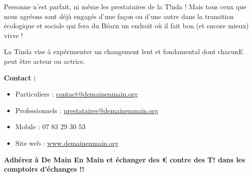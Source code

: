     \vspace{.5cm}

\noindent Personne n’est parfait, ni même les prestataires de la T!nda ! Mais tous ceux que nous agréons sont déjà engagés
d’une façon ou d’une autre dans la transition écologique et sociale qui fera du Béarn un endroit où il fait bon (et
encore mieux) vivre !
    \vspace{.2cm}

\noindent La Tinda vise à expérimenter un changement lent et fondamental dont chacunE peut être acteur ou actrice.

    \vspace{1cm}

      \textbf{Contact :}
    \begin{itemize}
      \item[] Particuliers : \href{mailto:contact@demainenmain.org}{contact@demainenmain.org}
      \item[] Professionnels : \href{mailto:prestataires@demainenmain.org}{prestataires@demainenmain.org}
      \item[] Mobile : 07 83 29 30 53 
      \item[] Site web : \href{https://www.demainenmain.org}{www.demainenmain.org}
    \end{itemize}

    \vspace{1cm}

  \begin{center}
    {\Large \textbf{Adhérez à De Main En Main et échanger des € contre des T! dans les comptoirs d’échanges !!}}
  \end{center}

  \pagebreak

  \begin{center}
  \parbox{11cm}{\tableofcontents}
  \end{center}
